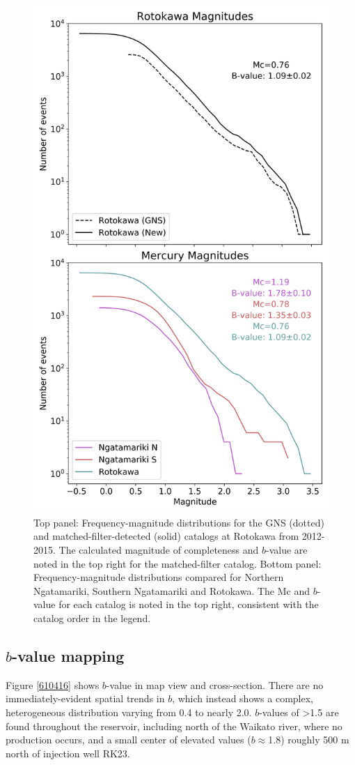 \begin{figure}[h!]
\begin{center}
\includegraphics[width=0.70\columnwidth]{Chapter_4_Rot/figures/Rot_cumulative_bval_plot/Merc_cumulative_bval_all_2-panel}
\caption[Catalog frequency-magnitude distributions]{{
Top panel: Frequency-magnitude distributions for the GNS (dotted) and
matched-filter-detected (solid) catalogs at Rotokawa from 2012-2015. The
calculated magnitude of completeness and $b$-value are noted in the top
right for the matched-filter catalog. Bottom panel: Frequency-magnitude
distributions compared for Northern Ngatamariki, Southern Ngatamariki
and Rotokawa. The Mc and $b$-value for each catalog is noted in the top
right, consistent with the catalog order in the legend.
{\label{848333}}%
}}
\end{center}
\end{figure}

\subsection{$b$-value mapping}
Figure \ref{610416} shows $b$-value in map view and cross-section. There are no immediately-evident spatial trends in $b$, which instead shows a complex, heterogeneous distribution varying from 0.4 to nearly 2.0. $b$-values of \textgreater1.5 are found throughout the reservoir, including north of the Waikato river, where no production occurs, and a small center of elevated values ($b\approx$1.8) roughly 500 m north of injection well RK23.

